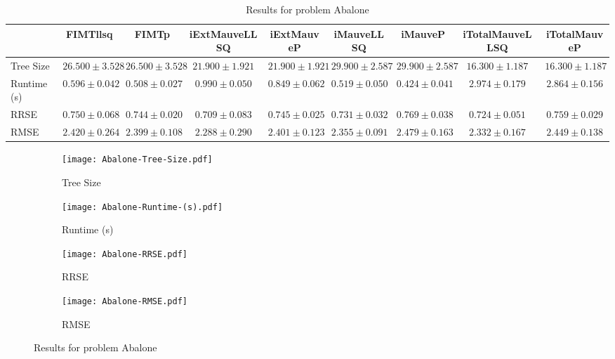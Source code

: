 \documentclass{article}
\begin{document}
\begin{table}[h]
\tiny
\begin{tabular}{|l|c|c|c|c|c|c|c|c|}
\hline
 & FIMTllsq & FIMTp & iExtMauveLLSQ & iExtMauveP & iMauveLLSQ & iMauveP & iTotalMauveLLSQ & iTotalMauveP\\
\hline
Tree Size & $26.500 \pm 3.528$ & $26.500 \pm 3.528$ & $21.900 \pm 1.921$ & $21.900 \pm 1.921$ & $29.900 \pm 2.587$ & $29.900 \pm 2.587$ & \cellcolor{blue!25} $16.300 \pm 1.187$ & \cellcolor{blue!25} $16.300 \pm 1.187$ \\
\hline
Runtime (s) & $0.596 \pm 0.042$ & $0.508 \pm 0.027$ & $0.990 \pm 0.050$ & $0.849 \pm 0.062$ & $0.519 \pm 0.050$ & \cellcolor{blue!25} $0.424 \pm 0.041$ & $2.974 \pm 0.179$ & $2.864 \pm 0.156$ \\
\hline
RRSE & $0.750 \pm 0.068$ & $0.744 \pm 0.020$ & \cellcolor{blue!25} $0.709 \pm 0.083$ & $0.745 \pm 0.025$ & $0.731 \pm 0.032$ & $0.769 \pm 0.038$ & $0.724 \pm 0.051$ & $0.759 \pm 0.029$ \\
\hline
RMSE & $2.420 \pm 0.264$ & $2.399 \pm 0.108$ & \cellcolor{blue!25} $2.288 \pm 0.290$ & $2.401 \pm 0.123$ & $2.355 \pm 0.091$ & $2.479 \pm 0.163$ & $2.332 \pm 0.167$ & $2.449 \pm 0.138$ \\
\hline
\end{tabular}
\caption{Results for problem Abalone}
\end{table}
\begin{figure}[h]
\centering
\begin{subfigure}{0.45\textwidth}
  \texttt{[image: Abalone-Tree-Size.pdf]}
  \caption{Tree Size}
\end{subfigure}
\begin{subfigure}{0.45\textwidth}
  \texttt{[image: Abalone-Runtime-(s).pdf]}
  \caption{Runtime (s)}
\end{subfigure}
\begin{subfigure}{0.45\textwidth}
  \texttt{[image: Abalone-RRSE.pdf]}
  \caption{RRSE}
\end{subfigure}
\begin{subfigure}{0.45\textwidth}
  \texttt{[image: Abalone-RMSE.pdf]}
  \caption{RMSE}
\end{subfigure}
\caption{Results for problem Abalone}
\end{figure}
\end{document}
